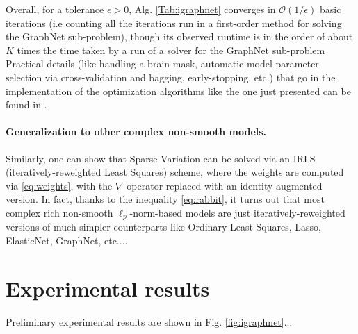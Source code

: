 Overall, for a
tolerance $\epsilon > 0$, Alg. \ref{Tab:igraphnet} converges
in $\mathcal O(1/\epsilon)$ basic
iterations (i.e counting all the iterations run in a first-order
method for solving the GraphNet sub-problem), though its observed
runtime is in the order of about $K$ times the time taken by a run of
a solver for the GraphNet sub-problem
Practical details (like handling a brain mask, automatic model
parameter selection via cross-validation and bagging, early-stopping,
etc.) that go in the implementation of the optimization algorithms like the
one just presented can be found in
\cite{dohmatob2014benchmarking}.

\paragraph*{Generalization to other complex non-smooth models.}
Similarly, one can show that Sparse-Variation
\citep{eickenberg2015total} can be solved via an IRLS
(iteratively-reweighted Least Squares) scheme, where the weights are
computed via \eqref{eq:weights}, with the $\nabla$ operator replaced
with an identity-augmented version. In fact, thanks to the inequality
\eqref{eq:rabbit}, it turns out that most
complex rich non-smooth $\ell_p$-norm-based models are just
iteratively-reweighted versions of much simpler counterparts like
Ordinary Least Squares, Lasso, ElasticNet, GraphNet, etc....

\section{Experimental results}
Preliminary experimental results are shown in Fig. \ref{fig:igraphnet}...

